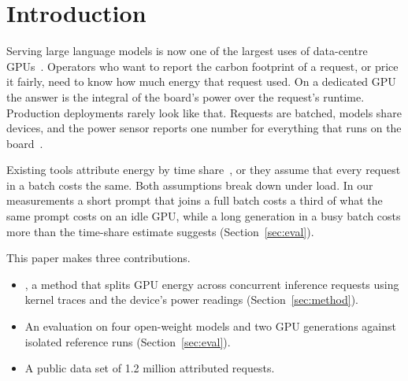 \section{Introduction}\label{sec:intro}

Serving large language models is now one of the largest uses of data-centre GPUs~\cite{kessler2025inference}.
Operators who want to report the carbon footprint of a request, or price it fairly, need to know how much energy that request used.
On a dedicated GPU the answer is the integral of the board's power over the request's runtime.
Production deployments rarely look like that.
Requests are batched, models share devices, and the power sensor reports one number for everything that runs on the board~\cite{varga2024sensors}.

Existing tools attribute energy by time share~\cite{quintero2023carbon}, or they assume that every request in a batch costs the same.
Both assumptions break down under load.
In our measurements a short prompt that joins a full batch costs a third of what the same prompt costs on an idle GPU, while a long generation in a busy batch costs more than the time-share estimate suggests (Section~\ref{sec:eval}).

This paper makes three contributions.
\begin{itemize}
  \item \sysname{}, a method that splits GPU energy across concurrent inference requests using kernel traces and the device's power readings (Section~\ref{sec:method}).
  \item An evaluation on four open-weight models and two GPU generations against isolated reference runs (Section~\ref{sec:eval}).
  \item A public data set of 1.2 million attributed requests.
\end{itemize}

